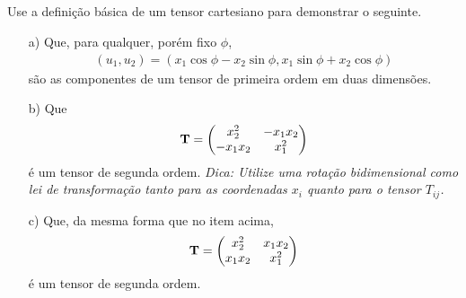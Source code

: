 \documentclass[a4paper,12pt]{article}
\begin{document}
\newpage

\\
\\
\\
\\



\indent \par Use a definição básica de um tensor cartesiano para demonstrar o seguinte.
%
\begin{itemize}
 \item[a)] Que, para qualquer, porém fixo $\phi$,
%
 \begin{eqnarray}
  \nonumber
  (u_1 , u_2)=(x_1 \cos\phi - x_2 \sin\phi, x_1\sin\phi + x_2\cos\phi)
 \end{eqnarray}
%
\noindent são as componentes de um tensor de primeira ordem em duas dimensões.
%
\item[b)] Que 
%
\begin{eqnarray}
  \nonumber
  {\bf{T}}= 
  \begin{pmatrix}
 x_{2}^{2} & -x_{1}x_{2} \\
 -x_{1}x_{2} & x_{1}^{2}  
\end{pmatrix}
%
 \end{eqnarray}
 \noindent é um tensor de segunda ordem. {\it{Dica: Utilize uma rotação bidimensional como lei de transformação tanto para as coordenadas $x_i$ quanto para o tensor $T_{ij}$.}}
\item[c)] Que, da mesma forma que no item acima,  
%
\begin{eqnarray}
  \nonumber
  {\bf{T}}= 
  \begin{pmatrix}
 x_{2}^{2} & x_{1}x_{2} \\
 x_{1}x_{2} & x_{1}^{2}  
\end{pmatrix}
%
 \end{eqnarray}
  é um tensor de segunda ordem.\\
 \end{itemize}
%

\end{document}
